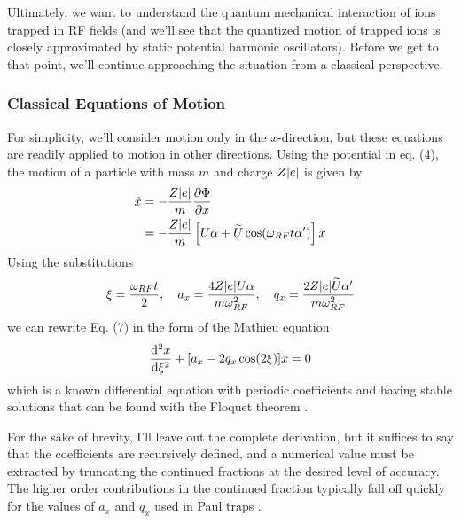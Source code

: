 Ultimately, we want to understand the quantum mechanical interaction of ions trapped in RF fields (and we'll see that the quantized motion of trapped ions is closely approximated by static potential harmonic oscillators). Before we get to that point, we'll continue approaching the situation from a classical perspective.
\subsubsection{Classical Equations of Motion}
For simplicity, we'll consider motion only in the $x$-direction, but these equations are readily applied to motion in other directions. Using the potential in eq. (4), the motion of a particle with mass $m$ and charge $Z\abs{e}$ is given by
\begin{align}
    \ddot{x} &= -\frac{Z\abs{e}}{m} \partialderivative{\Phi}{x}\\
    \nonumber&= -\frac{Z\abs{e}}{m} \left[ U\alpha + \widetilde{U} \cos(\omega_{RF} t \alpha')\right] x
\end{align}
Using the substitutions
\begin{equation}
    \xi = \frac{\omega_{RF} t}{2}, \quad a_x = \frac{4Z\abs{e} U\alpha}{m \omega_{RF}^2}, \quad q_x = \frac{2 Z\abs{e} \widetilde{U}\alpha'}{m \omega_{RF}^2}
\end{equation}
we can rewrite Eq. (7) in the form of the Mathieu equation
\begin{equation}
    \derivative{^2 x}{\xi^2} + [a_x - 2q_x \cos(2\xi)] x = 0
\end{equation}
which is a known differential equation with periodic coefficients and having stable solutions that can be found with the Floquet theorem \cite{Leibfried}. 

For the sake of brevity, I'll leave out the complete derivation, but it suffices to say that the coefficients are recursively defined, and a numerical value must be extracted by truncating the continued fractions at the desired level of accuracy. The higher order contributions in the continued fraction typically fall off quickly for the values of $a_x$ and $q_x$ used in Paul traps \cite{Leibfried}.

